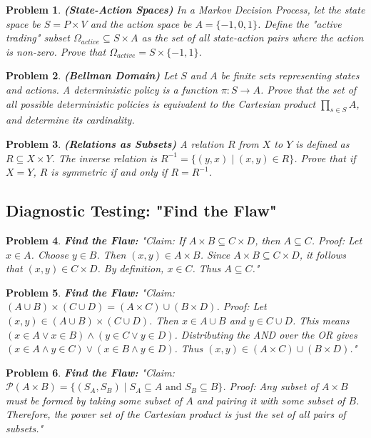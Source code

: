 \documentclass[11pt]{article}
\newtheorem{problem}{Problem}
\begin{document}
\begin{problem}
\textbf{(State-Action Spaces)} In a Markov Decision Process, let the state space be $S = P \times V$ and the action space be $A = \{-1, 0, 1\}$. Define the "active trading" subset $\Omega_{active} \subseteq S \times A$ as the set of all state-action pairs where the action is non-zero. Prove that $\Omega_{active} = S \times \{-1, 1\}$.
\end{problem}

\begin{problem}
\textbf{(Bellman Domain)} Let $S$ and $A$ be finite sets representing states and actions. A deterministic policy is a function $\pi: S \to A$. Prove that the set of all possible deterministic policies is equivalent to the Cartesian product $\prod_{s \in S} A$, and determine its cardinality.
\end{problem}

\begin{problem}
\textbf{(Relations as Subsets)} A relation $R$ from $X$ to $Y$ is defined as $R \subseteq X \times Y$. The inverse relation is $R^{-1} = \{(y,x) \mid (x,y) \in R\}$. Prove that if $X=Y$, $R$ is symmetric if and only if $R = R^{-1}$.
\end{problem}

\subsection{Diagnostic Testing: "Find the Flaw"}
\begin{problem}
\textbf{Find the Flaw:} "Claim: If $A \times B \subseteq C \times D$, then $A \subseteq C$. Proof: Let $x \in A$. Choose $y \in B$. Then $(x,y) \in A \times B$. Since $A \times B \subseteq C \times D$, it follows that $(x,y) \in C \times D$. By definition, $x \in C$. Thus $A \subseteq C$."
\end{problem}

\begin{problem}
\textbf{Find the Flaw:} "Claim: $(A \cup B) \times (C \cup D) = (A \times C) \cup (B \times D)$. Proof: Let $(x,y) \in (A \cup B) \times (C \cup D)$. Then $x \in A \cup B$ and $y \in C \cup D$. This means $(x \in A \lor x \in B) \land (y \in C \lor y \in D)$. Distributing the AND over the OR gives $(x \in A \land y \in C) \lor (x \in B \land y \in D)$. Thus $(x,y) \in (A \times C) \cup (B \times D)$."
\end{problem}

\begin{problem}
\textbf{Find the Flaw:} "Claim: $\mathcal{P}(A \times B) = \{ (S_A, S_B) \mid S_A \subseteq A \text{ and } S_B \subseteq B \}$. Proof: Any subset of $A \times B$ must be formed by taking some subset of $A$ and pairing it with some subset of $B$. Therefore, the power set of the Cartesian product is just the set of all pairs of subsets."
\end{problem}
\end{document}
